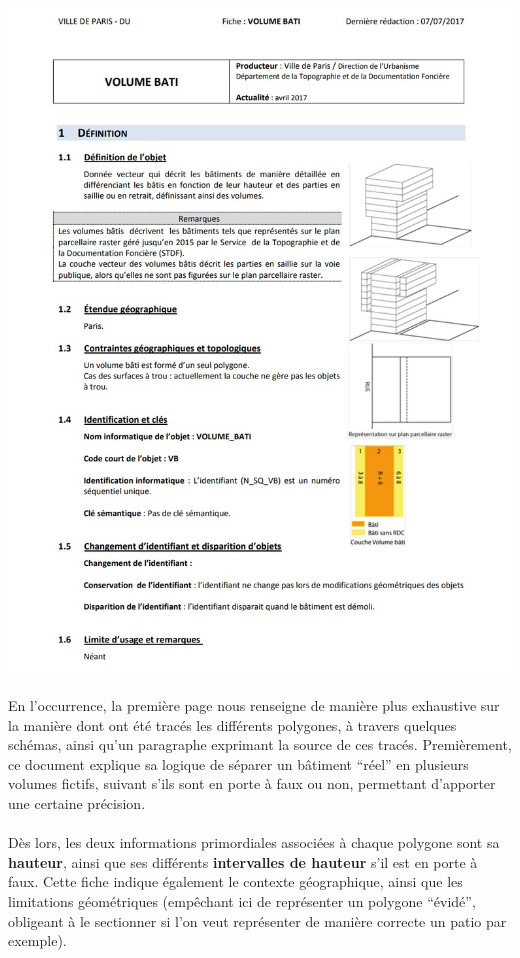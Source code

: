 \documentclass[
  11pt,
  french,
]{article}
\newcounter{customfigs}[section]
\newenvironment{customfigs}[1][] {
    \stepcounter{customfigs}
    Fig \arabic{section}. \arabic{customfigs} : }
\newcommand{\masked}{\vspace*{-\baselineskip}}
\begin{document}
\begin{tcolorbox}[title=\begin{customfigs} Page descriptive issue des métadonnées \end{customfigs}]

\begin{center}\includegraphics[height=0.49\textheight]{__imgs/odp_meta1} \end{center}

\end{tcolorbox}

\hfill\break
En l'occurrence, la première page nous renseigne de manière plus
exhaustive sur la manière dont ont été tracés les différents polygones,
à travers quelques schémas, ainsi qu'un paragraphe exprimant la source
de ces tracés. Premièrement, ce document explique sa logique de séparer
un bâtiment ``réel'' en plusieurs volumes fictifs, suivant s'ils sont en
porte à faux ou non, permettant d'apporter une certaine précision.\\
~\\
Dès lors, les deux informations primordiales associées à chaque polygone
sont sa \textbf{hauteur}, ainsi que ses différents \textbf{intervalles
de hauteur} s'il est en porte à faux. Cette fiche indique également le
contexte géographique, ainsi que les limitations géométriques (empêchant
ici de représenter un polygone ``évidé'', obligeant à le sectionner si
l'on veut représenter de manière correcte un patio par exemple).\\
\end{document}
